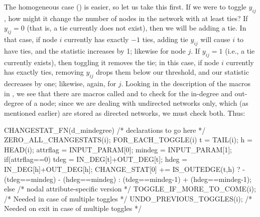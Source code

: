 \documentclass[nojss]{jss}
\begin{document}
The homogeneous case () is easier, so let us take this first.
If we were to toggle $y_{ij}$, how might it change the number of nodes in the
network with at least  ties? If $y_{ij}=0$ (that is, a tie
currently does not exist), then we will be adding a tie. In that case, if node
$i$ currently has exactly $-1$ ties, adding tie $y_{ij}$ will cause
$i$ to have  ties, and the statistic increases by 1; likewise for
node $j$. If $y_{ij}=1$ (i.e., a tie currently exists), then toggling it removes
the tie; in this case, if node $i$ currently has exactly  ties,
removing $y_{ij}$ drops them below our threshold, and our statistic decreases by
one; likewise, again, for $j$. Looking in the description of the macros in
, we see that there are macros called  and
 to check for the in-degree and out-degree of a node; since we are
dealing with undirected networks only, which (as mentioned earlier) are stored
as directed networks, we must check both. 
Thus:
\begin{CodeChunk}
\begin{CodeInput}
CHANGESTAT_FN(d_mindegree) {
  /* declarations to go here */
  ZERO_ALL_CHANGESTATS(i);
  FOR_EACH_TOGGLE(i) {
    t = TAIL(i); h = HEAD(i);
    attrflag = INPUT_PARAM[0];
    mindeg = INPUT_PARAM[1];
    if(attrflag==0){
      tdeg = IN_DEG[t]+OUT_DEG[t];
      hdeg = IN_DEG[h]+OUT_DEG[h];
      CHANGE_STAT[0] += IS_OUTEDGE(t,h) ?
        - (tdeg==mindeg) - (hdeg==mindeg) :
        (tdeg==mindeg-1) + (hdeg==mindeg-1);
    }else{
      /* nodal attribute-specific version */
    }
    TOGGLE_IF_MORE_TO_COME(i); /* Needed in case of multiple toggles */
  }
  UNDO_PREVIOUS_TOGGLES(i); /* Needed on exit in case of multiple toggles */
}
\end{CodeInput}
\end{CodeChunk}
\end{document}

